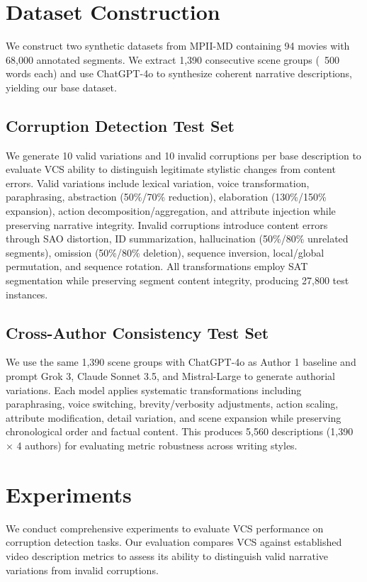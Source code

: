 \documentclass[letterpaper]{article} %
\begin{document}
\section{Dataset Construction}

We construct two synthetic datasets from MPII-MD \citep{rohrbach2015dataset} containing 94 movies with 68,000 annotated segments. We extract 1,390 consecutive scene groups (~500 words each) and use ChatGPT-4o to synthesize coherent narrative descriptions, yielding our base dataset.

\subsection{Corruption Detection Test Set}
We generate 10 valid variations and 10 invalid corruptions per base description to evaluate VCS ability to distinguish legitimate stylistic changes from content errors. Valid variations include lexical variation, voice transformation, paraphrasing, abstraction (50\%/70\% reduction), elaboration (130\%/150\% expansion), action decomposition/aggregation, and attribute injection while preserving narrative integrity. Invalid corruptions introduce content errors through SAO distortion, ID summarization, hallucination (50\%/80\% unrelated segments), omission (50\%/80\% deletion), sequence inversion, local/global permutation, and sequence rotation. All transformations employ SAT segmentation while preserving segment content integrity, producing 27,800 test instances.

\subsection{Cross-Author Consistency Test Set}
We use the same 1,390 scene groups with ChatGPT-4o as Author 1 baseline and prompt Grok 3, Claude Sonnet 3.5, and Mistral-Large to generate authorial variations. Each model applies systematic transformations including paraphrasing, voice switching, brevity/verbosity adjustments, action scaling, attribute modification, detail variation, and scene expansion while preserving chronological order and factual content. This produces 5,560 descriptions (1,390 × 4 authors) for evaluating metric robustness across writing styles.

\section{Experiments}

We conduct comprehensive experiments to evaluate VCS performance on corruption detection tasks. Our evaluation compares VCS against established video description metrics to assess its ability to distinguish valid narrative variations from invalid corruptions.
\end{document}
